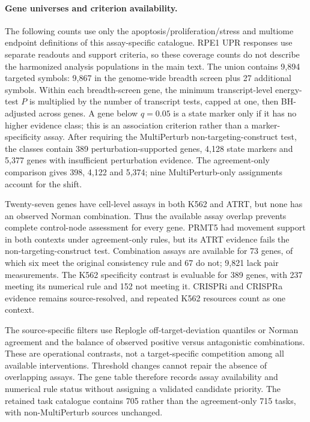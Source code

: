 \documentclass[a4paper,fleqn]{cas-sc}
\makeatletter
\DeclareRobustCommand{\rev}[1]{{\color{red}\def\@citecolor{black}\def\@linkcolor{red}\def\@urlcolor{red}#1}}
\makeatother
\begin{document}
\paragraph{Gene universes and criterion availability.}

\rev{The following counts use only the apoptosis/proliferation/stress and multiome endpoint definitions of this assay-specific catalogue.} \rev{RPE1 UPR responses use separate readouts and support criteria, so these coverage counts do not describe the harmonized analysis populations in the main text.}
The union contains 9,894 targeted symbols: 9,867 in the genome-wide breadth screen plus 27 additional symbols. \rev{Within each breadth-screen gene, the minimum transcript-level energy-test $P$ is multiplied by the number of transcript tests, capped at one, then BH-adjusted across genes.} \rev{A gene below $q=0.05$ is a state marker only if it has no higher evidence class; this is an association criterion rather than a marker-specificity assay.} \rev{After requiring the MultiPerturb non-targeting-construct test, the classes contain 389 perturbation-supported genes, 4,128 state markers and 5,377 genes with insufficient perturbation evidence.} \rev{The agreement-only comparison gives 398, 4,122 and 5,374; nine MultiPerturb-only assignments account for the shift.}

\rev{Twenty-seven genes have cell-level assays in both K562 and ATRT, but none has an observed Norman combination.} \rev{Thus the available assay overlap prevents complete control-node assessment for every gene.} \rev{PRMT5 had movement support in both contexts under agreement-only rules, but its ATRT evidence fails the non-targeting-construct test.} \rev{Combination assays are available for 73 genes, of which six meet the original consistency rule and 67 do not; 9,821 lack pair measurements.} \rev{The K562 specificity contrast is evaluable for 389 genes, with 237 meeting its numerical rule and 152 not meeting it.} \rev{CRISPRi and CRISPRa evidence remains source-resolved, and repeated K562 resources count as one context.}

\rev{The source-specific filters use Replogle off-target-deviation quantiles or Norman agreement and the balance of observed positive versus antagonistic combinations.} \rev{These are operational contrasts, not a target-specific competition among all available interventions.} \rev{Threshold changes cannot repair the absence of overlapping assays.} \rev{The gene table therefore records assay availability and numerical rule status without assigning a validated candidate priority.} \rev{The retained task catalogue contains 705 rather than the agreement-only 715 tasks, with non-MultiPerturb sources unchanged.}
\end{document}
